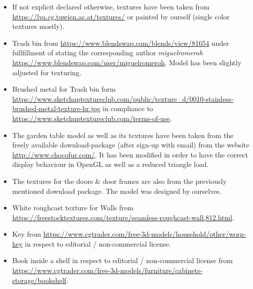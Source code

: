 \documentclass[12pt]{article}
\begin{document}
\begin{itemize}

\item If not explicit declared otherwise, textures have been taken from
\url{https://lva.cg.tuwien.ac.at/textures/} or painted by ourself (single color textures mostly).

\item Trash bin from \url{https://www.blendswap.com/blends/view/81654} under fullfillment of stating the corresponding author \textit{miguelromeroh} \url{https://www.blendswap.com/user/miguelromeroh}. Model has been slightly adjusted for texturing.

\item Brushed metal for Trash bin form \url{https://www.sketchuptextureclub.com/public/texture_d/0010-stainless-brushed-metal-texture-hr.jpg} in compliance to \url{https://www.sketchuptextureclub.com/terms-of-use}.

\item The garden table model as well as its textures have been taken from the freely available download-package (after sign-up with email) from the website
\url{http://www.chocofur.com/}. It has been modified in order to have the correct display behaviour in OpenGL as well as a reduced triangle load.

\item The textures for the doors \& door frames are also from the previously mentioned download package. The model was designed by ourselves.


\item White roughcast texture for Walls from \url{https://freestocktextures.com/texture/seamless-roughcast-wall,812.html}.


\item Key from \url{https://www.cgtrader.com/free-3d-models/household/other/worn-key} in respect to editorial / non-commercial license.

\item Book inside a shelf in respect to editorial / non-commercial license from \url{https://www.cgtrader.com/free-3d-models/furniture/cabinets-storage/bookshelf}.


\end{itemize}
\end{document}
